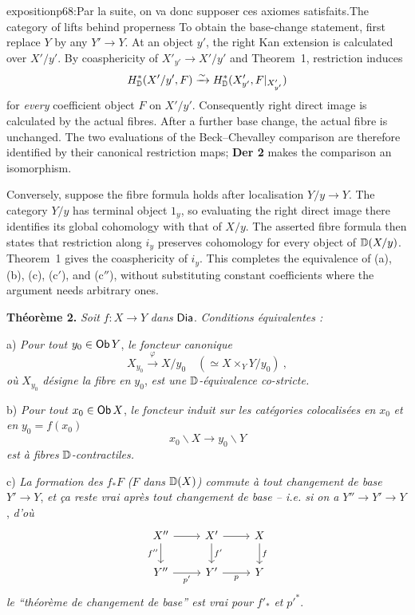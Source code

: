 \begin{dcomment}{exposition}{p68:Par la suite, on va donc supposer ces axiomes satisfaits.}{The category of lifts behind properness}
To obtain the base-change statement, first replace $Y$ by any $Y'\to Y$. At an object $y'$, the right Kan extension is calculated over $X'/y'$. By coasphericity of $X'_{y'}\to X'/y'$ and Theorem~1, restriction induces
\[
 H^*_{\mathbb{D}}(X'/y',F)\xrightarrow{\sim}
 H^*_{\mathbb{D}}(X'_{y'},F|_{X'_{y'}})
\]
for \emph{every} coefficient object $F$ on $X'/y'$. Consequently right direct image is calculated by the actual fibres. After a further base change, the actual fibre is unchanged. The two evaluations of the Beck--Chevalley comparison are therefore identified by their canonical restriction maps; \textbf{Der 2} makes the comparison an isomorphism.

Conversely, suppose the fibre formula holds after localisation $Y/y\to Y$. The category $Y/y$ has terminal object $1_y$, so evaluating the right direct image there identifies its global cohomology with that of $X/y$. The asserted fibre formula then states that restriction along $i_y$ preserves cohomology for every object of $\mathbb{D}(X/y)$. Theorem~1 gives the coasphericity of $i_y$. This completes the equivalence of (a), (b), (c), (c$'$), and (c$''$), without substituting constant coefficients where the argument needs arbitrary ones.
\end{dcomment}


\noindent\textbf{Théorème 2.} \textit{Soit} $f : X \to Y$ \textit{dans} $\mathsf{Dia}$. \textit{Conditions équivalentes :}

a) \textit{Pour tout} $y_0 \in \mathsf{Ob}\, Y$, \textit{le foncteur canonique}
\[
X_{y_0} \overset{\varphi}{\longrightarrow} X/y_0 \quad (\simeq X \times_Y Y/y_0) \ ,
\]
\textit{où} $X_{y_0}$ \textit{désigne la fibre en} $y_0$, \textit{est une} $\mathbb{D}$\textit{-équivalence co-stricte.}

b) \textit{Pour tout} $x_0 \in \mathsf{Ob}\, X$, \textit{le foncteur induit sur les catégories colocalisées en} $x_0$ \textit{et en} $y_0 = f(x_0)$
\[
x_0\backslash X \longrightarrow y_0\backslash Y
\]
\textit{est à fibres} $\mathbb{D}$\textit{-contractiles.}


c) \textit{La formation des} $f_*F$ \textit{(}$F$ \textit{dans} $\mathbb{D}(X)$\textit{) commute à tout changement de base} $Y' \to Y$, \textit{et ça reste vrai après tout changement de base -- i.e. si on a} $Y'' \to Y' \to Y$, \textit{d'où}
\[
\begin{tikzcd}
X'' \arrow[r] \arrow[d, "f''"{swap}] & X' \arrow[r] \arrow[d, "f'"] & X \arrow[d, "f"] \\
Y'' \arrow[r, "p'"{swap}] & Y' \arrow[r, "p"{swap}] & Y
\end{tikzcd}
\]
\textit{le “théorème de changement de base” est vrai pour} $f'_*$ \textit{et} $p'^{*}$.

